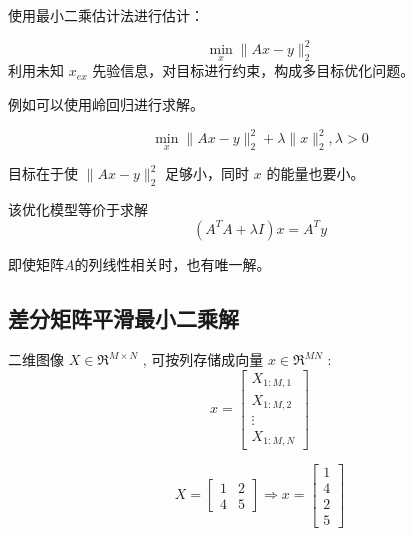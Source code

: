 使用最小二乘估计法进行估计：

\begin{problem}[最小二乘法进行估计]
    \begin{equation}
\min _{x}\|A x-y\|_{2}^{2}
\end{equation}
利用未知 $ x_{e x} $ 先验信息，对目标进行约束，构成多目标优化问题。 
\end{problem}


例如可以使用岭回归进行求解。


\begin{definition}
    \begin{equation}
\min _{x}\|A x-y\|_{2}^{2}+\lambda\|x\|_{2}^{2}, \lambda>0
\end{equation}
\end{definition}

目标在于使 $ \|A x-y\|_{2}^{2} $ 足够小，同时 $ x $ 的能量也要小。

\begin{theorem}[岭回归问题的标准方程]
    该优化模型等价于求解
\begin{equation}
\left(A^{T} A+\lambda I\right) x=A^{T} y
\end{equation}
\end{theorem}

即使矩阵$A$的列线性相关时，也有唯一解。

\subsection{差分矩阵平滑最小二乘解}

\begin{definition}[图像转换为列向量存储]
    二维图像 $ X \in \mathfrak{R}^{M \times N} $ , 可按列存储成向量 $ x \in \mathfrak{R}^{M N} $ :
    \begin{equation}
    x=\left[\begin{array}{c}
    X_{1: M, 1} \\
    X_{1: M, 2} \\
    \vdots \\
    X_{1: M, N}
    \end{array}\right] \end{equation} 
\end{definition}


\begin{example}
    \begin{equation} 
X=\left[\begin{array}{ll}
1 & 2 \\
4 & 5
\end{array}\right] \Rightarrow x=\left[\begin{array}{l}
1 \\
4 \\
2 \\
5
\end{array}\right]
\end{equation}
\end{example}

